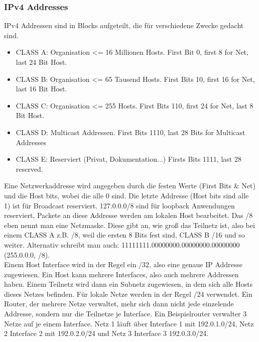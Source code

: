         \subsubsection{IPv4 Addresses}
            IPv4 Addressen sind in Blocks aufgeteilt, die für verschiedene Zwecke gedacht sind. 
            \begin{itemize}
                \item CLASS A: Organisation <= 16 Millionen Hosts. First Bit 0, first 8 for Net, last 24 Bit Host.
                \item CLASS B: Organisation <= 65 Tausend Hosts. First Bits 10, first 16 for Net, last 16 Bit Host.
                \item CLASS C: Organisation <= 255 Hosts. First Bits 110, first 24 for Net, last 8 Bit Host.
                \item CLASS D: Multicast Addressen. First Bits 1110, last 28 Bits for Multicast Addresses
                \item CLASS E: Reserviert (Privat, Dokumentation...) Firsts Bits 1111, last 28 reserved. 
            \end{itemize}
            Eine Netzwerkaddresse wird angegeben durch die festen Werte (First Bits \& Net) und die Host bits, wobei die alle 0 sind. Die letzte Addresse (Host bits sind alle 1) ist für Broadcast reserviert. 127.0.0.0/8 sind für loopback Anwendungen reserviert, Packete an diese Addresse werden am lokalen Host bearbeitet. Das /8 eben nennt man eine Netzmaske. Diese gibt an, wie groß das Teilnetz ist, also bei einem CLASS A z.B. /8, weil die ersten 8 Bits fest sind, CLASS B /16 und so weiter. Alternativ schreibt man auch: 11111111.00000000.00000000.00000000 (255.0.0.0, /8). \\
            Einem Host Interface wird in der Regel ein /32, also eine genaue IP Addresse zugewiesen. Ein Host kann mehrere Interfaces, also auch mehrere Addressen haben. Einem Teilnetz wird dann ein Subnetz zugewiesen, in dem sich alle Hosts dieses Netzes befinden. Für lokale Netze werden in der Regel /24 verwendet. Ein Router, der mehrere Netze verwaltet, mehr sich dann nicht jede einzelende Addresse, sondern nur die Teilnetze je Interface. Ein Beispielrouter verwalter 3 Netze auf je einem Interface. Netz 1 läuft über Interface 1 mit 192.0.1.0/24, Netz 2 Interface 2 mit 192.0.2.0/24 und Netz 3 Interface 3 192.0.3.0/24. 
